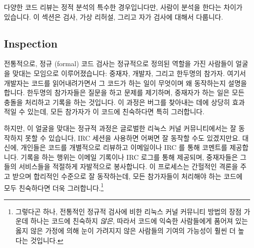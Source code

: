다양한 코드 리뷰는 정적 분석의 특수한 경우입니다만, 사람이 분석을 한다는 차이가
있습니다.
이 섹션은 검사, 가상 리허설, 그리고 자가 검사에 대해서 다룹니다.

\subsection{Inspection}
\label{sec:debugging:Inspection}

전통적으로, 정규 (formal) 코드 검사는 정규적으로 정의된 역할을 가진 사람들이
얼굴을 맞대는 모임으로 이루어졌습니다: 중재자, 개발자, 그리고 한두명의 참가자.
여기서 개발자는 코드를 읽어내려가면서 그 코드가 하는 일이 무엇이며 왜
동작하는지 설명을 합니다.
한두명의 참가자들은 질문을 하고 문제를 제기하며, 중재자가 하는 일은 모든 충돌을
처리하고 기록을 하는 것입니다.
이 과정은 버그를 찾아내는 데에 상당히 효과적일 수 있는데, 모든 참가자가 이
코드에 친숙하다면 특히 그러합니다.

하지만, 이 얼굴을 맞대는 정규적 과정은 글로벌한 리눅스 커널 커뮤니티에서는 잘
동작하지 못할 수 있습니다, IRC 세션을 사용하면 어쩌면 잘 동작할 수도
있겠지만요.
대신에, 개인들은 코드를 개별적으로 리뷰하고 이메일이나 IRC 를 통해 코멘트를
제공합니다.
기록을 하는 행위는 이메일 기록이나 IRC 로그를 통해 제공되며, 중재자들은 그들의
서비스들을 적절하게 자발적으로 봉사합니다.
이 프로세스는 간헐적인 격론을 주고 받으며 합리적인 수준으로 잘 동작하는데,
모든 참가자들이 처리해야 하는 코드에 모두 친숙하다면 더욱 그러합니다.\footnote{
	그렇다곤 하나, 전통적인 정규적 검사에 비한 리눅스 커널 커뮤니티 방법의
	장점 가운데 하나는 코드에 친숙하지 \emph{않은}, 따라서 코드에 익숙한
	사람들에게 품어져 있는 옳지 않은 가정에 의해 눈이 가려지지 않은
	사람들의 기여의 가능성이 훨씬 더 높다는 것입니다.}
\iffalse

